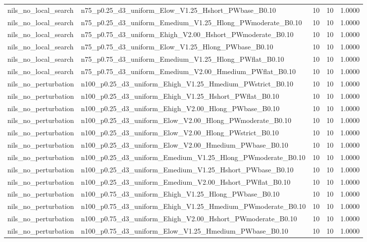 \begin{tabular}{llrrr}
nils_no_local_search & n75_p0.25_d3_uniform_Elow_V1.25_Hshort_PWbase_B0.10 & 10 & 10 & 1.0000 \\
nils_no_local_search & n75_p0.25_d3_uniform_Emedium_V1.25_Hlong_PWmoderate_B0.10 & 10 & 10 & 1.0000 \\
nils_no_local_search & n75_p0.75_d3_uniform_Ehigh_V2.00_Hshort_PWmoderate_B0.10 & 10 & 10 & 1.0000 \\
nils_no_local_search & n75_p0.75_d3_uniform_Elow_V1.25_Hlong_PWbase_B0.10 & 10 & 10 & 1.0000 \\
nils_no_local_search & n75_p0.75_d3_uniform_Emedium_V1.25_Hlong_PWflat_B0.10 & 10 & 10 & 1.0000 \\
nils_no_local_search & n75_p0.75_d3_uniform_Emedium_V2.00_Hmedium_PWflat_B0.10 & 10 & 10 & 1.0000 \\
nils_no_perturbation & n100_p0.25_d3_uniform_Ehigh_V1.25_Hmedium_PWstrict_B0.10 & 10 & 10 & 1.0000 \\
nils_no_perturbation & n100_p0.25_d3_uniform_Ehigh_V1.25_Hshort_PWflat_B0.10 & 10 & 10 & 1.0000 \\
nils_no_perturbation & n100_p0.25_d3_uniform_Ehigh_V2.00_Hlong_PWbase_B0.10 & 10 & 10 & 1.0000 \\
nils_no_perturbation & n100_p0.25_d3_uniform_Elow_V2.00_Hlong_PWmoderate_B0.10 & 10 & 10 & 1.0000 \\
nils_no_perturbation & n100_p0.25_d3_uniform_Elow_V2.00_Hlong_PWstrict_B0.10 & 10 & 10 & 1.0000 \\
nils_no_perturbation & n100_p0.25_d3_uniform_Elow_V2.00_Hmedium_PWbase_B0.10 & 10 & 10 & 1.0000 \\
nils_no_perturbation & n100_p0.25_d3_uniform_Emedium_V1.25_Hlong_PWmoderate_B0.10 & 10 & 10 & 1.0000 \\
nils_no_perturbation & n100_p0.25_d3_uniform_Emedium_V1.25_Hshort_PWbase_B0.10 & 10 & 10 & 1.0000 \\
nils_no_perturbation & n100_p0.25_d3_uniform_Emedium_V2.00_Hshort_PWflat_B0.10 & 10 & 10 & 1.0000 \\
nils_no_perturbation & n100_p0.75_d3_uniform_Ehigh_V1.25_Hlong_PWbase_B0.10 & 10 & 10 & 1.0000 \\
nils_no_perturbation & n100_p0.75_d3_uniform_Ehigh_V1.25_Hmedium_PWmoderate_B0.10 & 10 & 10 & 1.0000 \\
nils_no_perturbation & n100_p0.75_d3_uniform_Ehigh_V2.00_Hshort_PWmoderate_B0.10 & 10 & 10 & 1.0000 \\
nils_no_perturbation & n100_p0.75_d3_uniform_Elow_V1.25_Hmedium_PWbase_B0.10 & 10 & 10 & 1.0000 \\

\end{tabular}

